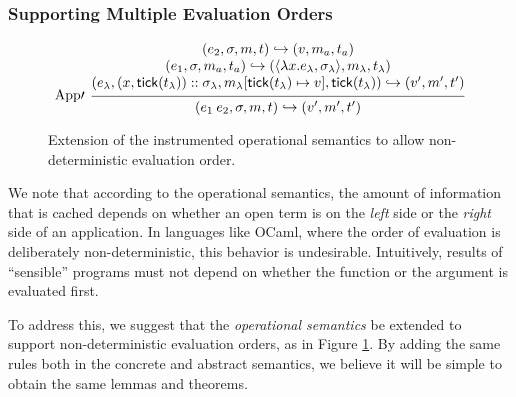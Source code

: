 \documentclass[acmsmall,screen,review]{acmart}\settopmatter{printfolios=true,printccs=false,printacmref=false}
\theoremstyle{acmdefinition}
\newcommand*{\cons}{::}
\newcommand*{\ctx}{\sigma}
\newcommand*{\mem}{m}
\newcommand*{\semarrow}{\hookrightarrow}
\newcommand*{\tick}{\mathsf{tick}}
\begin{document}
\subsubsection{Supporting Multiple Evaluation Orders}
\begin{figure}[h!]
  \scriptsize
  \begin{flushright}
    \fbox{$(e,\ctx,\mem,t)\semarrow(V,\mem',t')\text{ or }(e',\ctx',\mem',t')$}
  \end{flushright}
  \[
    \begin{prooftree}
      \hypo{
        \begin{matrix}
          (e_{2}, \ctx, \mem, t)
          \semarrow
          (v, \mem_{a}, t_{a})                                                               \\
          (e_{1}, \ctx, \mem_{a}, t_{a})
          \semarrow
          (\langle\lambda x.e_{\lambda}, \ctx_{\lambda}\rangle, \mem_{\lambda}, t_{\lambda}) \\
          (e_{\lambda}, (x, \tick(t_{\lambda}))\cons \ctx_{\lambda}, \mem_{\lambda}[\tick(t_{\lambda})\mapsto v], \tick(t_{\lambda}))
          \semarrow
          (v', \mem',t')
        \end{matrix}
      }
      \infer[left label={App$\prime$}]1{
      (e_{1}\:e_{2}, \ctx, \mem, t)
      \semarrow
      (v', \mem',t')
      }
    \end{prooftree}
  \]
  \caption{Extension of the instrumented operational semantics to allow non-deterministic evaluation order.}
  \label{fig:cbvorder}
\end{figure}
We note that according to the operational semantics, the amount of information that is cached depends on whether an open term is on the \emph{left} side or the \emph{right} side of an application.
In languages like OCaml, where the order of evaluation is deliberately non-deterministic, this behavior is undesirable.
Intuitively, results of ``sensible'' programs must not depend on whether the function or the argument is evaluated first.

To address this, we suggest that the \emph{operational semantics} be extended to support non-deterministic evaluation orders, as in Figure \ref{fig:cbvorder}.
By adding the same rules both in the concrete and abstract semantics, we believe it will be simple to obtain the same lemmas and theorems.
\end{document}
